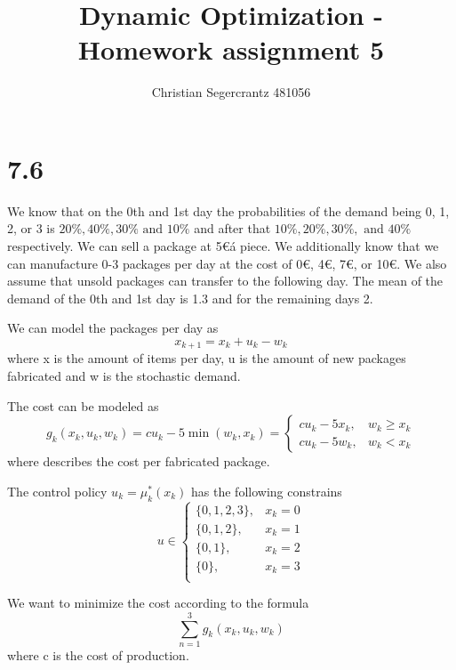 \documentclass{article}
\title{Dynamic Optimization - Homework assignment 5}
\author{Christian Segercrantz 481056}
\begin{document}
	\maketitle
	\pagebreak

\section*{7.6}

We know that on the 0th and 1st day the probabilities of the demand being 0, 1, 2, or 3 is $20\%, 40\%, 30\% \text{ and } 10\%$ and after that $10\%, 20\%, 30\%, \text{ and } 40\%$ respectively. We can sell a package at 5\euro á piece. We additionally know that we can manufacture 0-3 packages per day at the cost of 0\euro, 4\euro, 7\euro, or 10\euro. We also assume that unsold packages can transfer to the following day. The mean of the demand of the 0th and 1st day is 1.3 and for the remaining days 2. 

We can model the packages per day as
\begin{equation}
	x_{k+1} = x_{k} + u_k - w_k
\end{equation}
where x is the amount of items per day, u is the amount of new packages fabricated and w is the stochastic demand.

The cost can be modeled as 
\begin{equation}
	g_k(x_k,u_k,w_k) = c u_k - 5\min(w_k,x_k) =
	 \begin{cases}
		c u_k - 5x_k, & w_k \geq x_k\\
		c u_k - 5w_k, & w_k < x_k
	\end{cases} 
\end{equation}
where describes the cost per fabricated package.

The control policy $u_k = \mu^*_k(x_k)$ has the following constrains
\begin{equation}
	u \in
	\begin{cases}
		\lbrace0,1,2,3\rbrace, &x_k = 0\\
		\lbrace0,1,2\rbrace, &x_k = 1\\
		\lbrace0,1\rbrace, &x_k = 2\\
		\lbrace0\rbrace, &x_k = 3\\	
	\end{cases}
\end{equation}

We want to minimize the cost  according to the formula
\begin{equation}
	\sum_{n=1}^{3} g_k(x_k,u_k,w_k)
\end{equation}
where c is the cost of production.
\end{document}
